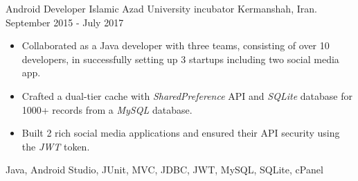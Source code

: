 \begin{experiences}
\emptySeparator

\experience
{}
{Android Developer}
{Islamic Azad University incubator}
{Kermanshah, Iran. \hspace{60 pt} September 2015 - July 2017}
{}
{
\begin{itemize}
\item Collaborated as a Java developer with three teams, consisting of over 10 developers, in successfully setting up 3 startups including two social media app.
\item Crafted a dual-tier cache with \emph{SharedPreference} API and \emph{SQLite} database for 1000+ records from a \emph{MySQL} database.
\item Built 2 rich social media applications and ensured their API security using the \emph{JWT} token.
\end{itemize}
}{Java, Android Studio, JUnit, MVC, JDBC, JWT, MySQL, SQLite, cPanel}
\end{experiences}